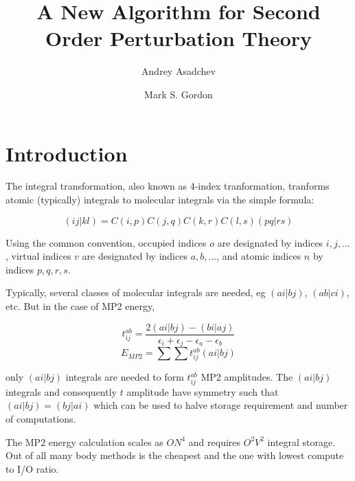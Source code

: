 \documentclass[12pt]{article} \usepackage[margin=1in]{geometry}
\begin{document}
\title{A New Algorithm for Second Order Perturbation Theory}
\author{Andrey Asadchev \and Mark S. Gordon}
\date{}

\maketitle




\section{Introduction}
The integral transformation, also known as 4-index tranformation,
tranforms atomic (typically) integrals to molecular integrals via the
simple formula:

$$(ij|kl) = C(i,p)C(j,q)C(k,r)C(l,s)(pq|rs)$$

Using the common convention, occupied indices $o$ are designated by
indices $i,j,...$, virtual indices $v$ are designated by indices $a,
b,...$, and atomic indices $n$ by indices $p,q,r,s$.

Typically, several classes of molecular integrals are needed, eg
$(ai|bj)$, $(ab|ci)$, etc.  But in the case of MP2 energy,

$$t_{ij}^{ab} = \frac{2 (ai|bj) - (bi|aj)}{\epsilon_i + \epsilon_j - \epsilon_a -
  \epsilon_b}$$
$$E_{MP2} = \sum \sum t_{ij}^{ab}(ai|bj)$$

only $(ai|bj)$ integrals are needed to form $t_{ij}^{ab}$ MP2
amplitudes.  The $(ai|bj)$ integrals and consequently $t$ amplitude
have symmetry such that $(ai|bj) = (bj|ai)$ which can be used to halve
storage requirement and number of computations.

The MP2 energy calculation scales as $O N^4$ and requires $O^2 V^2$
integral storage. Out of all many body methods is the cheapest and the
one with lowest compute to I/O ratio.
\end{document}
